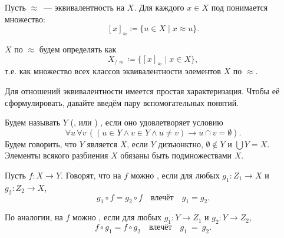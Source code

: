 \begin{definition*}
    Пусть $\approx$~--- эквивалентность на $X$. Для каждого $x \in X$ под  понимается множество:
    $$
        [x]_{\approx} \coloneqq \{u \in X \mid x \approx u\}.
    $$

     $X$ по $\approx$ будем определять как
    $$
        X_{/\approx} \coloneqq \{ [x]_{\approx} \mid x \in X\},
    $$
    т.е. как множество всех классов эквивалентности элементов $X$ по $\approx$.
\end{definition*}


Для отношений эквивалентности имеется простая характеризация. Чтобы её сформулировать, давайте введём
пару вспомогательных понятий.
\begin{definition*}
    Будем называть $Y$ (, или ) , если оно
    удовлетворяет условию
    $$
        \forall u\, \forall v\, ((u \in Y \wedge v \in Y \wedge u \ne v) \rightarrow u \cap v = \emptyset).
    $$
    Будем говорить, что $Y$ является  $X$, если $Y$ дизъюнктно, $\emptyset \not \in
    Y$ и $\bigcup Y = X$. Элементы всякого разбиения $X$ обязаны быть подмножествами $X$.
\end{definition*}





\begin{definition}
    Пусть $f\colon X \rightarrow Y$. Говорят, что на $f$ можно , если для любых
    $g_1\colon Z_1 \rightarrow X$ и $g_2\colon Z_2 \rightarrow X$,
    $$
        g_1 \circ f = g_2 \circ f \quad \text{влечёт} \quad g_1 = g_2.
    $$

    По аналогии, на $f$ можно , если для любых $g_1\colon Y \rightarrow Z_1$ и
    $g_2\colon Y \rightarrow Z_2$,
    $$
        f \circ g_1 = f \circ g_2 \quad \text{влечёт} \quad g_1\ =\ g_2.
    $$
\end{definition}


